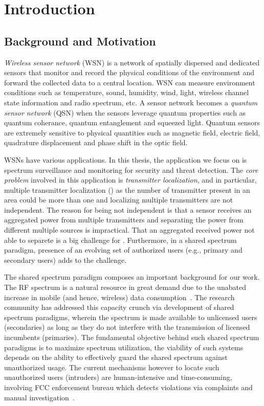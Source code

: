 \chapter{Introduction}
\label{chap:intro}

\section{Background and Motivation}

\emph{Wireless sensor network} (WSN) is a network of spatially dispersed and dedicated sensors that monitor and record the 
physical conditions of the environment and forward the collected data to a central location.
WSN can measure environment conditions such as temperature, sound, humidity, wind, light, wireless channel state information and radio spectrum, etc.
A sensor network becomes a \emph{quantum sensor network} (QSN) when the sensors leverage quantum properties
such as quantum coherance, quantum entanglement and squeezed light.
Quantum sensors are extremely sensitive to physical quantities such as magnetic field, electric field, quadrature displacement
and phase shift in the optic field.

 WSNs have various applications.
In this thesis, the application we focus on is spectrum surveillance and monitoring for security and threat detection.
The \emph{core problem} involved in this application is \emph{transmitter localization}, and in particular, multiple transmitter localization (\mtl) as 
the number of transmitter present in an area could be more than one and localizing multiple transmitters are not independent.
The reason for being not independent is that a sensor receives an aggregated power from multiple transmitters and separating 
the power from different multiple sources is impractical.
That an aggregated received power not able to separete is a big challenge for \mtl.
Furthermore, in a shared spectrum paradigm, presence of an evolving set of authorized users 
(e.g., primary and secondary users) adds to the challenge.

The shared spectrum paradigm composes an important background for our \mtl work.
The RF spectrum is a natural resource in great demand due to the unabated increase in mobile (and hence, wireless) data consumption~\cite{Jeffrey14}. 
The research community has addressed this capacity crunch via development of shared spectrum paradigms, wherein the spectrum 
is made available to unlicensed users (secondaries) as long as they do not interfere with the transmission of licensed incumbents (primaries).
The fundamental objective behind such shared spectrum paradigms is to maximize spectrum utilization,
the viability of such systems depends on the ability to effectively guard the shared spectrum against unauthorized usage. 
The current mechanisms however to locate such unauthorized users (intruders) are human-intensive and time-consuming, 
involving FCC enforcement bureau which detects violations via complaints and manual investigation~\cite{mobicom17-splot}. 


